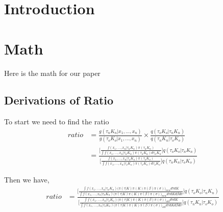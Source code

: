 \documentclass[submit]{smj}
\begin{document}
\maketitle


\section{Introduction}

\section{Math}
Here is the math for our paper

\subsection{Derivations of Ratio}


To start we need to find the ratio \\ 
\begin{align*}
ratio &= \frac{g(\tau_{n} K_{n} | x_1,\dots,x_n) }{g(\tau_{o} K_{o} | x_1,\dots,x_n)} \times \frac{q(\tau_{o} K_{o} | \tau_{n} K_{n})}{q(\tau_{n} K_{n}| \tau_{o} K_{o})} \\
&= \frac{\Big[ \frac{f(x_1,\dots,x_n | \tau_{n} K_{n}) \pi(\tau_{n} K_{n})}{\int f(x_1, \dots ,x_n | \tau_{n} K_{n}) \pi(\tau_{n} K_{n}) d \tau_{n} K_{n} } \Big] q(\tau_{o} K_{o} | \tau_{n} K_{n})}{\Big[ \frac{f(x_1,\dots,x_n | \tau_{o} K_{o}) \pi(\tau_{o} K_{o})}{\int f(x_1, \dots ,x_n | \tau_{o} K_{o}) \pi(\tau_{o} K_{o}) d \tau_{o} K_{o} }\Big] q(\tau_{n} K_{n}| \tau_{o} K_{o})} 
\end{align*}

Then we have,
\begin{align*}
ratio &= \frac{\Big[ \frac{ \int f(x_1,\dots,x_n | \tau_{n} K_{n}) \big(\pi(\tau|K)\pi(K)\pi(\beta)\pi(\sigma)\big)_{new} d\tau dK }{\int f(x_1, \dots ,x_n | \tau_{n} K_{n}) \big(\pi(\tau|K)\pi(K)\pi(\beta)\pi(\sigma)\big)_{new} d\tau dK d \beta d\sigma } \Big] q(\tau_{o} K_{o} | \tau_{n} K_{n})}{\Big[ \frac{ \int f(x_1,\dots,x_n | \tau_{o} K_{o}) \big(\pi(\tau|K)\pi(K)\pi(\beta)\pi(\sigma)\big)_{old} d\tau dK}{\int f(x_1, \dots ,x_n | \tau_{o} K_{o}) \big(\pi(\tau|K)\pi(K)\pi(\beta)\pi(\sigma)\big)_{old} d \tau dK d \beta d\sigma }\Big] q(\tau_{n} K_{n}| \tau_{o} K_{o})} 
\end{align*}
\end{document}
